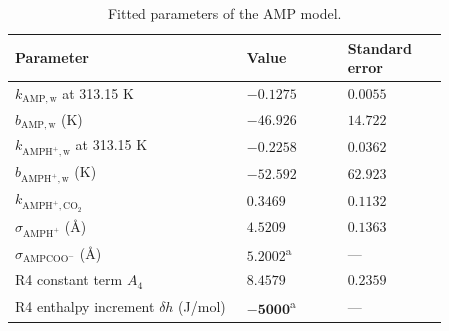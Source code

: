 \begin{table}[pos=!htbp]\small\setlength{\tabcolsep}{2pt}\caption{Fitted parameters of the AMP model.}\label{tab:amp-fitted}
\begin{tabular}{@{}>{\raggedright\arraybackslash}p{0.46\linewidth}>{\raggedright\arraybackslash}p{0.2\linewidth}>{\raggedright\arraybackslash}p{0.2\linewidth}@{}}
\toprule Parameter & Value & Standard error \\ \midrule
$k_{\mathrm{AMP,w}}$ at 313.15 K & $\boldsymbol{-0.1275}$ & $0.0055$ \\
$b_{\mathrm{AMP,w}}$ (K) & $\boldsymbol{-46.926}$ & $14.722$ \\
$k_{\mathrm{AMPH^+,w}}$ at 313.15 K & $\boldsymbol{-0.2258}$ & $0.0362$ \\
$b_{\mathrm{AMPH^+,w}}$ (K) & $\boldsymbol{-52.592}$ & $62.923$ \\
$k_{\mathrm{AMPH^+,CO_2}}$ & $\boldsymbol{0.3469}$ & $0.1132$ \\
$\sigma_{\mathrm{AMPH^+}}$ (\AA) & $\boldsymbol{4.5209}$ & $0.1363$ \\
$\sigma_{\mathrm{AMPCOO^-}}$ (\AA) & $\boldsymbol{5.2002}$\textsuperscript{a} & --- \\
R4 constant term $A_4$ & $\boldsymbol{8.4579}$ & $0.2359$ \\
R4 enthalpy increment $\delta h$ (J/mol) & $\boldsymbol{-5000}$\textsuperscript{a} & --- \\
\bottomrule\end{tabular}
\par{}\end{table}
